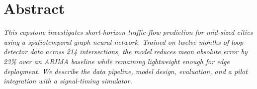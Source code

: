 \section*{\normalsize\color{ink}Abstract}
\vspace{-4pt}
\noindent\textit{This capstone investigates short-horizon traffic-flow prediction for
mid-sized cities using a spatiotemporal graph neural network. Trained on twelve months of
loop-detector data across 214 intersections, the model reduces mean absolute error by 23\%
over an ARIMA baseline while remaining lightweight enough for edge deployment. We describe
the data pipeline, model design, evaluation, and a pilot integration with a signal-timing
simulator.}
